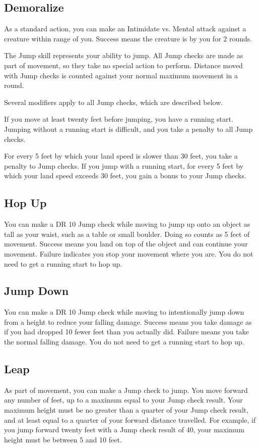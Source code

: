     \subsection{Demoralize}\label{Demoralize}
        As a standard action, you can make an Intimidate vs. Mental attack against a creature within \rngmed range of you. Success means the creature is \shaken by you for 2 rounds.

        The Jump skill represents your ability to jump. All Jump checks are made as part of movement, so they take no special action to perform. Distance moved with Jump checks is counted against your normal maximum movement in a round.

        Several modifiers apply to all Jump checks, which are described below.

        \label{Running Start} If you move at least twenty feet before jumping, you have a running start.
        Jumping without a running start is difficult, and you take a  penalty to all Jump checks.

         For every 5 feet by which your land speed is slower than 30 feet, you take a  penalty to Jump checks. If you jump with a running start, for every 5 feet by which your land speed exceeds 30 feet, you gain a  bonus to your Jump checks.

    \subsection{Hop Up}
        You can make a DR 10 Jump check while moving to jump up onto an object as tall as your waist, such as a table or small boulder. Doing so counts as 5 feet of movement. Success means you land on top of the object and can continue your movement. Failure indicates you stop your movement where you are. You do not need to get a running start to hop up.

    \subsection{Jump Down}
        You can make a DR 10 Jump check while moving to intentionally jump down from a height to reduce your falling damage. Success means you take damage as if you had dropped 10 fewer feet than you actually did. Failure means you take the normal falling damage. You do not need to get a running start to hop up.

    \subsection{Leap}\label{Leap}
        As part of movement, you can make a Jump check to jump.
        You move forward any number of feet, up to a maximum equal to your Jump check result.
        Your maximum height must be no greater than a quarter of your Jump check result, and at least equal to a quarter of your forward distance travelled.
        For example, if you jump forward twenty feet with a Jump check result of 40, your maximum height must be between 5 and 10 feet.

